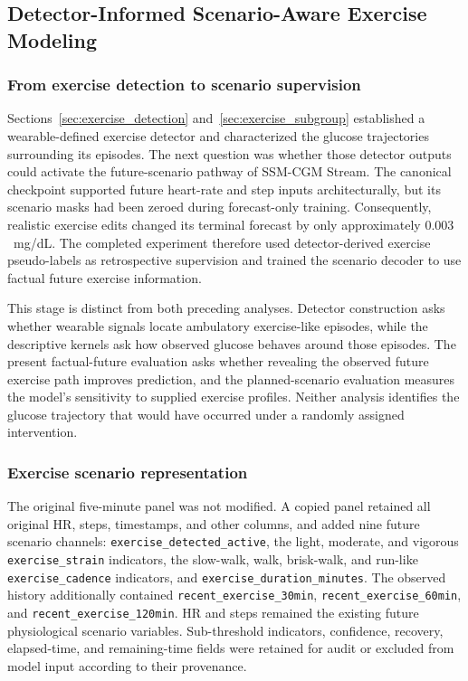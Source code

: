 \subsection{Detector-Informed Scenario-Aware Exercise Modeling}
\label{subsec:detector_scenario_modeling}

\subsubsection{From exercise detection to scenario supervision}

Sections~\ref{sec:exercise_detection} and~\ref{sec:exercise_subgroup}
established a wearable-defined exercise detector and characterized the glucose
trajectories surrounding its episodes. The next question was whether those
detector outputs could activate the future-scenario pathway of SSM-CGM Stream.
The canonical checkpoint supported future heart-rate and step inputs
architecturally, but its scenario masks had been zeroed during forecast-only
training. Consequently, realistic exercise edits changed its terminal forecast
by only approximately $0.003$~mg/dL. The completed experiment therefore used
detector-derived exercise pseudo-labels as retrospective supervision and
trained the scenario decoder to use factual future exercise information.

This stage is distinct from both preceding analyses. Detector construction asks
whether wearable signals locate ambulatory exercise-like episodes, while the
descriptive kernels ask how observed glucose behaves around those episodes.
The present factual-future evaluation asks whether revealing the observed
future exercise path improves prediction, and the planned-scenario evaluation
measures the model's sensitivity to supplied exercise profiles. Neither
analysis identifies the glucose trajectory that would have occurred under a
randomly assigned intervention.

\subsubsection{Exercise scenario representation}

The original five-minute panel was not modified. A copied panel retained all
original HR, steps, timestamps, and other columns, and added nine future
scenario channels: \texttt{exercise\_detected\_active}, the light, moderate,
and vigorous \texttt{exercise\_strain} indicators, the slow-walk, walk,
brisk-walk, and run-like \texttt{exercise\_cadence} indicators, and
\texttt{exercise\_duration\_minutes}. The observed history additionally
contained \texttt{recent\_exercise\_30min},
\texttt{recent\_exercise\_60min}, and
\texttt{recent\_exercise\_120min}. HR and steps remained the existing future
physiological scenario variables. Sub-threshold indicators, confidence,
recovery, elapsed-time, and remaining-time fields were retained for audit or
excluded from model input according to their provenance.

